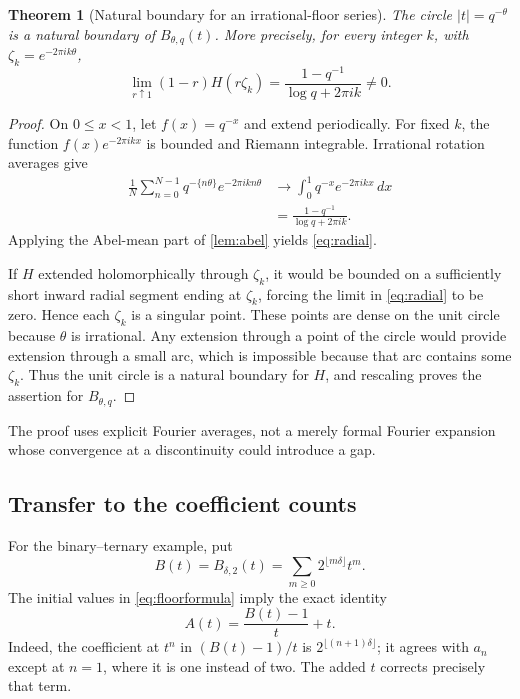 \documentclass[11pt,letterpaper]{article}
\numberwithin{equation}{section}
\newtheorem{theorem}{Theorem}[section]
\theoremstyle{definition}
\theoremstyle{remark}
\begin{document}
\begin{theorem}[Natural boundary for an irrational-floor series]\label{thm:floorboundary}
The circle $|t|=q^{-\theta}$ is a natural boundary of $B_{\theta,q}(t)$. More precisely, for every integer $k$, with $\zeta_k=e^{-2\pi i k\theta}$,
\begin{equation}\label{eq:radial}
 \lim_{r\uparrow1}(1-r)H(r\zeta_k)
 =\frac{1-q^{-1}}{\log q+2\pi i k}\ne0.
\end{equation}
\end{theorem}
\begin{proof}
On $0\le x<1$, let $f(x)=q^{-x}$ and extend periodically. For fixed $k$, the function $f(x)e^{-2\pi i kx}$ is bounded and Riemann integrable. Irrational rotation averages give
\begin{align*}
 \frac1N\sum_{n=0}^{N-1}q^{-\{n\theta\}}e^{-2\pi i kn\theta}
 &\longrightarrow\int_0^1q^{-x}e^{-2\pi i kx}\,dx\\
 &=\frac{1-q^{-1}}{\log q+2\pi i k}.
\end{align*}
Applying the Abel-mean part of \cref{lem:abel} yields \eqref{eq:radial}.

If $H$ extended holomorphically through $\zeta_k$, it would be bounded on a sufficiently short inward radial segment ending at $\zeta_k$, forcing the limit in \eqref{eq:radial} to be zero. Hence each $\zeta_k$ is a singular point. These points are dense on the unit circle because $\theta$ is irrational. Any extension through a point of the circle would provide extension through a small arc, which is impossible because that arc contains some $\zeta_k$. Thus the unit circle is a natural boundary for $H$, and rescaling proves the assertion for $B_{\theta,q}$.
\end{proof}

The proof uses explicit Fourier averages, not a merely formal Fourier expansion whose convergence at a discontinuity could introduce a gap.

\subsection{Transfer to the coefficient counts}
For the binary--ternary example, put
\[
 B(t)=B_{\delta,2}(t)=\sum_{m\ge0}2^{\lfloor m\delta\rfloor}t^m.
\]
The initial values in \eqref{eq:floorformula} imply the exact identity
\begin{equation}\label{eq:AB}
 A(t)=\frac{B(t)-1}{t}+t.
\end{equation}
Indeed, the coefficient at $t^n$ in $(B(t)-1)/t$ is $2^{\lfloor(n+1)\delta\rfloor}$; it agrees with $a_n$ except at $n=1$, where it is one instead of two. The added $t$ corrects precisely that term.
\end{document}
